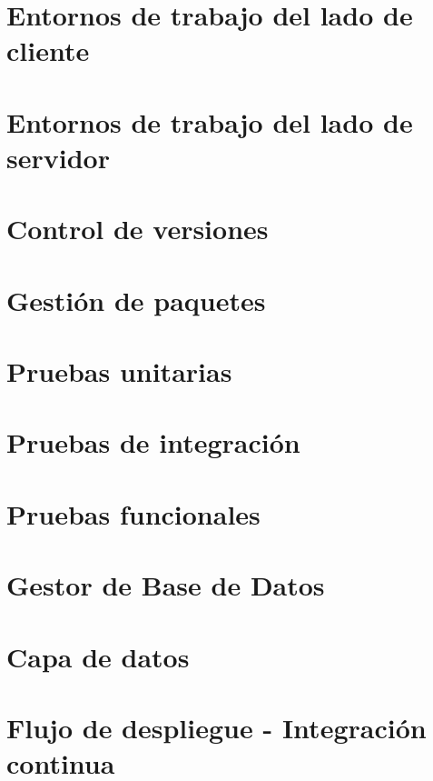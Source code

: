 \documentclass[
  a4paper,  %
  twoside,  %
  bibliography=totoc,
  headsepline,
  cleardoublepage=empty,
  parskip=half,
  draft=false
]{scrbook}
\begin{document}
\section{Entornos de trabajo del lado de cliente}


\section{Entornos de trabajo del lado de servidor}


\section{Control de versiones}


\section{Gestión de paquetes}

\label{section:packet-manager}

\section{Pruebas unitarias}
\label{section:unit-testing}


\section{Pruebas de integración}
\label{section:integration-testing}


\section{Pruebas funcionales}
\label{section:e2e-testing}


\section{Gestor de Base de Datos}

\label{section:database-manager}

\section{Capa de datos}

\label{section:data-layer}

\section{Flujo de despliegue - Integración continua}
\label{section:ci-cd-flow}

\end{document}
